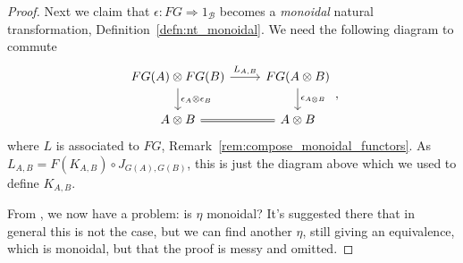 \documentclass[a4paper,11pt]{article}
\theoremstyle{plain}
\theoremstyle{remark}
\newcommand{\mc}[1]{\mathcal{#1}}
\begin{document}
\begin{proof}
Next we claim that $\epsilon \colon FG\Rightarrow 1_{\mc B}$ becomes a \emph{monoidal} natural transformation, Definition~\ref{defn:nt_monoidal}.  We need the following diagram to commute
\[\begin{tikzcd}
  FG(A)\otimes FG(B) \ar[r, "L_{A,B}"] \ar[d, "\epsilon_A\otimes\epsilon_B"]  &  FG(A\otimes B) \ar[d, "\epsilon_{A\otimes B}"] \\
  A\otimes B \ar[r, equals] & A\otimes B
\end{tikzcd}, \]
where $L$ is associated to $FG$, Remark~\ref{rem:compose_monoidal_functors}.  As $L_{A,B} = F(K_{A,B}) \circ J_{G(A), G(B)}$, this is just the diagram above which we used to define $K_{A,B}$.

From \cite{JT_Notes}, we now have a problem: is $\eta$ monoidal?  It's suggested there that in general this is not the case, but we can find another $\eta$, still giving an equivalence, which is monoidal, but that the proof is messy and omitted.


\end{proof}
\end{document}
